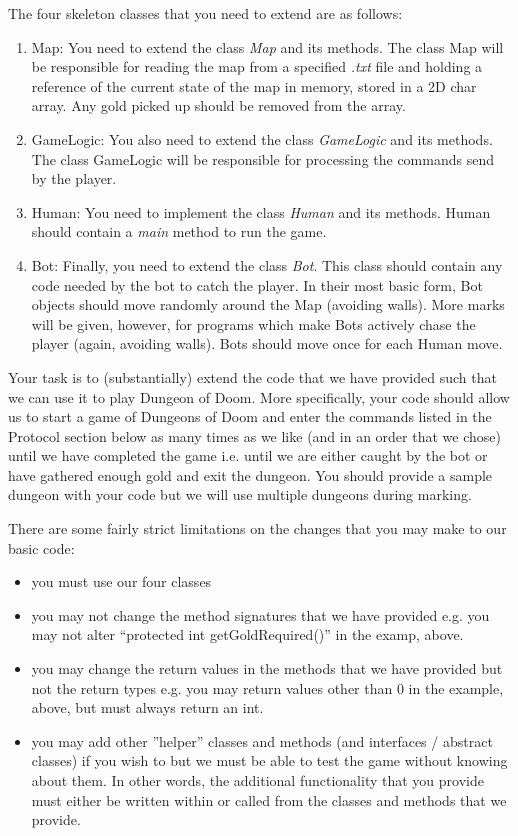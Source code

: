 \documentclass{article}
\begin{document}
{The four skeleton classes that you need to extend are as follows:
\begin{enumerate}
\item{Map:} You need to extend the class \textit{Map} and its methods. The class Map will be responsible for reading the map from a specified \textit{.txt} file and holding a reference of the current state of the map in memory, stored in a 2D char array. Any gold picked up should be removed from the array.
\item{GameLogic:} You also need to extend the class \textit{GameLogic} and its methods. The class GameLogic will be responsible for processing the commands send by the player.
\item{Human:} You need to implement the class \textit{Human} and its methods. Human should contain a \textit{main} method to run the game.
\item{Bot:} Finally, you need to extend the class \textit{Bot}. This class should contain any code needed by the bot to catch the player. In their most basic form, Bot objects should move randomly around the Map (avoiding walls). More marks will be given, however, for programs which make Bots actively chase the player (again, avoiding walls). Bots should move once for each Human move.
\end{enumerate}

Your task is to (substantially) extend the code that we have provided such that we can use it to play Dungeon of Doom. More specifically, your code should allow us to start a game of Dungeons of Doom and enter the commands listed in the Protocol section below as many times as we like (and in an order that we chose) until we have completed the game i.e. until we are either caught by the bot or have gathered enough gold and exit the dungeon. You should provide a sample dungeon with your code but we will use multiple dungeons during marking. 

There are some fairly strict limitations on the changes that you may make to our basic code:

\begin{itemize}
\item you must use our four classes
\item you may not change the method signatures that we have provided e.g. you may not alter ``protected int getGoldRequired()'' in the examp, above.
\item you may change the return values in the methods that we have provided but not the return types e.g. you may return values other than 0 in the example, above, but must always return an int.
\item you may add other ''helper''  classes and methods (and interfaces / abstract classes) if you wish to but we must be able to test the game without knowing about them. In other words, the additional functionality that you provide must either be written within or called from the classes and methods that we provide.
\end{itemize}

}
\end{document}
